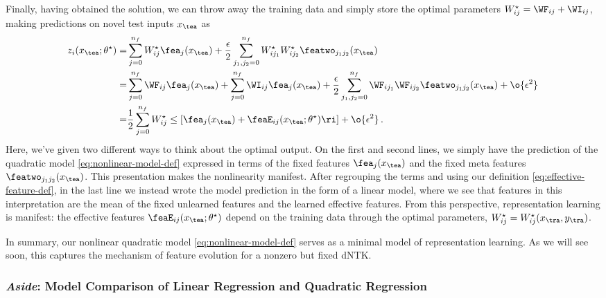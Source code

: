 Finally, having obtained the solution, we can throw away the training data and simply store the optimal parameters $W^{\star}_{ij}=\WF_{ij}+\WI_{ij}$, making predictions on novel test inputs $x_{\tea}$ as
\begin{align}\label{eq:nearly-kernel-prediction-nearly-kernel-methods-before-duality}
z_i(x_{\tea}; \theta^{\star})=&\sum_{j=0}^{n_f}W^{\star}_{ij}\fea_j(x_{\tea})+ \frac{\epsilon}{2}\sum_{j_1,j_2=0}^{n_f}W^{\star}_{ij_1}W^{\star}_{ij_2}\featwo_{j_1j_2}(x_{\tea})\, \\
=&\sum_{j=0}^{n_f}\WF_{ij}\fea_j(x_{\tea})+\sum_{j=0}^{n_f}\WI_{ij}\fea_j(x_{\tea})  + \frac{\epsilon}{2}\sum_{j_1,j_2=0}^{n_f}\WF_{ij_1}\WF_{ij_2}\featwo_{j_1j_2}(x_{\tea})+\o{\epsilon^2}\, \notag\\
=&\frac{1}{2}\sum_{j=0}^{n_f}W^{\star}_{ij}\le[\fea_j(x_{\tea})+\feaE_{ij}(x_{\tea}; \theta^{\star})\ri]+\o{\epsilon^2}\, .\notag
\end{align}
Here, we've given two different ways to think about the optimal output.
On the first and second lines, we simply have the prediction of the quadratic model \eqref{eq:nonlinear-model-def} expressed in terms of the fixed features $\fea_j(x_{\tea})$ and the fixed meta features $\featwo_{j_1j_2}(x_{\tea})$. This presentation makes the nonlinearity manifest.
After regrouping the terms and using our definition \eqref{eq:effective-feature-def}, in the last line we instead wrote the model prediction in the form of a linear model, where we see that features in this interpretation are the mean of the fixed unlearned features and the learned effective features. From this perspective, representation learning is manifest: the effective features $\feaE_{ij}(x_{\tea}; \theta^{\star})$ depend on the training data through the optimal parameters, $W^{\star}_{ij}=W^{\star}_{ij}(x_{\tra},y_{\tra})$. 







In summary, our nonlinear quadratic model \eqref{eq:nonlinear-model-def} serves as a minimal model of representation learning.
As we will see soon, this captures the mechanism of feature evolution for a nonzero but fixed dNTK.




\subsubsection{\emph{Aside}: Model Comparison of Linear Regression and Quadratic Regression}

